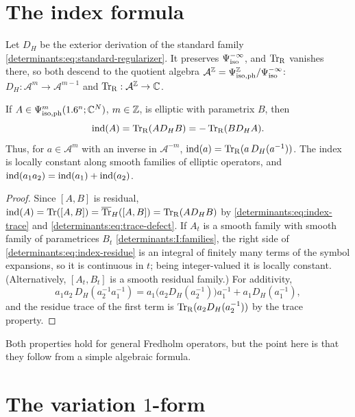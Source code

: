 \section{The index formula}\label{determinants:sec:index-formula}

Let $D_H$ be the exterior derivation of the standard family
\eqref{determinants:eq:standard-regularizer}. It preserves $\Psi^{-\infty}_{\mathrm{iso}}$,
and $\operatorname{Tr}_{\mathrm{R}}$ vanishes there, so both descend to the quotient algebra
$\mathcal A^{\mathbb{Z}}=\Psi^{\mathbb{Z}}_{\mathrm{iso,ph}}/\Psi^{-\infty}_{\mathrm{iso}}$:
$D_H:\mathcal A^m\to\mathcal A^{m-1}$ and $\operatorname{Tr}_{\mathrm{R}}:\mathcal A^{\mathbb{Z}}\to\mathbb{C}$.

\begin{theorem}\label{determinants:thm:index-formula}
  If $A\in\Psi^{m}_{\mathrm{iso,ph}}(1.6^n;\mathbb{C}^N)$, $m\in\mathbb{Z}$, is elliptic with parametrix $B$, then
  \begin{equation}\label{determinants:eq:index-residue}
    \operatorname{ind}(A)=\operatorname{Tr}_{\mathrm{R}}(AD_HB)=-\operatorname{Tr}_{\mathrm{R}}(BD_HA).
  \end{equation}
  Thus, for $a\in\mathcal A^m$ with an inverse in $\mathcal A^{-m}$,
  $\operatorname{ind}(a)=\operatorname{Tr}_{\mathrm{R}}(a\,D_H(a^{-1}))$.
  The index is locally constant along smooth families of elliptic operators,
  and $\operatorname{ind}(a_1a_2)=\operatorname{ind}(a_1)+\operatorname{ind}(a_2)$.
\end{theorem}
\begin{proof}
  Since $[A,B]$ is residual,
  $\operatorname{ind}(A)=\operatorname{Tr}([A,B])=\overline{\operatorname{Tr}}_{H}([A,B])=\operatorname{Tr}_{\mathrm{R}}(AD_HB)$ by
  \eqref{determinants:eq:index-trace} and
  \eqref{determinants:eq:trace-defect}. If $A_t$ is a smooth family with smooth
  family of parametrices $B_t$ \ref{determinants:I:families}, the right side
  of \eqref{determinants:eq:index-residue} is an integral of finitely many
  terms of the symbol expansions, so it is continuous in $t$; being
  integer-valued it is locally constant. (Alternatively, $[A_t,B_t]$ is a
  smooth residual family.) For additivity,
  \begin{equation*}
    a_1a_2\,D_H(a_2^{-1}a_1^{-1})=a_1\bigl(a_2D_H(a_2^{-1})\bigr)a_1^{-1}+a_1D_H(a_1^{-1}),
  \end{equation*}
  and the residue trace of the first term is $\operatorname{Tr}_{\mathrm{R}}(a_2D_H(a_2^{-1}))$ by
  the trace property.
\end{proof}

Both properties hold for general Fredholm operators, but the point here is
that they follow from a simple algebraic formula.

\section{The variation $1$-form}\label{determinants:sec:variation}

